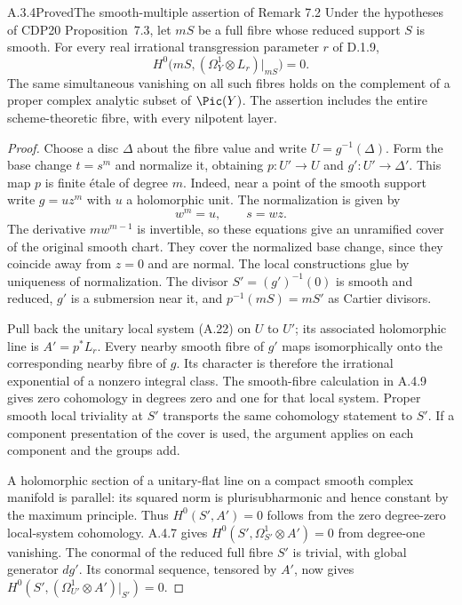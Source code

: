 \begin{statement}{A.3.4}{Proved}{The smooth-multiple assertion of Remark 7.2}
Under the hypotheses of CDP20 Proposition~7.3, let $mS$ be a full fibre whose reduced support $S$ is smooth. For every real irrational transgression parameter $r$ of D.1.9,
\[
 H^0\bigl(mS,(\Omega_Y^1\otimes L_r)|_{mS}\bigr)=0.
 \tag{A.15a}
\]
The same simultaneous vanishing on all such fibres holds on the complement of a proper complex analytic subset of $\Pic(Y)$. The assertion includes the entire scheme-theoretic fibre, with every nilpotent layer.
\end{statement}
\begin{proof}
Choose a disc $\Delta$ about the fibre value and write $U=g^{-1}(\Delta)$. Form the base change $t=s^m$ and normalize it, obtaining $p:U'\to U$ and $g':U'\to\Delta'$. This map $p$ is finite étale of degree $m$. Indeed, near a point of the smooth support write $g=u z^m$ with $u$ a holomorphic unit. The normalization is given by
\[
 w^m=u,\qquad s=wz.
\]
The derivative $m w^{m-1}$ is invertible, so these equations give an unramified cover of the original smooth chart. They cover the normalized base change, since they coincide away from $z=0$ and are normal. The local constructions glue by uniqueness of normalization. The divisor $S'=(g')^{-1}(0)$ is smooth and reduced, $g'$ is a submersion near it, and $p^{-1}(mS)=mS'$ as Cartier divisors.

Pull back the unitary local system (A.22) on $U$ to $U'$; its associated holomorphic line is $A'=p^*L_r$. Every nearby smooth fibre of $g'$ maps isomorphically onto the corresponding nearby fibre of $g$. Its character is therefore the irrational exponential of a nonzero integral class. The smooth-fibre calculation in A.4.9 gives zero cohomology in degrees zero and one for that local system. Proper smooth local triviality at $S'$ transports the same cohomology statement to $S'$. If a component presentation of the cover is used, the argument applies on each component and the groups add.

A holomorphic section of a unitary-flat line on a compact smooth complex manifold is parallel: its squared norm is plurisubharmonic and hence constant by the maximum principle. Thus $H^0(S',A')=0$ follows from the zero degree-zero local-system cohomology. A.4.7 gives $H^0(S',\Omega_{S'}^1\otimes A')=0$ from degree-one vanishing. The conormal of the reduced full fibre $S'$ is trivial, with global generator $dg'$. Its conormal sequence, tensored by $A'$, now gives
$H^0(S',(\Omega_{U'}^1\otimes A')|_{S'})=0$.


\end{proof}

